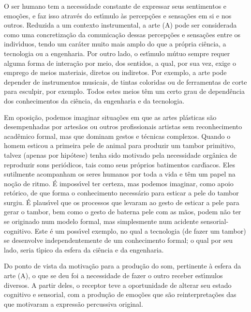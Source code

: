 \documentclass[
12pt,		%
openright,	%
twoside,  %
a4paper,			%
chapter=TITLE,		%
english,			%
french,				%
spanish,			%
brazil				%
]{USPSC-classe/USPSC}
\begin{document}
O ser humano tem a necessidade constante de expressar seus sentimentos e emo\c{c}\~oes, e faz isso atrav\'es do est\'{\i}mulo \`as percep\c{c}\~oes e sensa\c{c}\~oes em si e nos outros. Reduzida a um contexto instrumental, a arte (A) pode ser considerada como uma concretiza\c{c}\~ao da comunica\c{c}\~ao dessas percep\c{c}\~oes e sensa\c{c}\~oes entre os indiv\'{\i}duos, tendo um car\'ater muito mais amplo do que a pr\'opria ci\^encia, a tecnologia ou a engenharia. Por outro lado, o est\'{\i}mulo m\'utuo sempre requer alguma forma de intera\c{c}\~ao por meio, dos sentidos, a qual, por sua vez, exige o emprego de meios materiais, diretos ou indiretos. Por exemplo, a arte pode depender de instrumentos musicais, de tintas coloridas ou de ferramentas de corte para esculpir, por exemplo. Todos estes meios t\^em um certo grau de depend\^encia dos conhecimentos da ci\^encia, da engenharia e da tecnologia.









Em oposi\c{c}\~ao, podemos imaginar situa\c{c}\~oes em que as artes pl\'asticas s\~ao desempenhadas por artes\~aos ou outros profissionais artistas sem reconhecimento acad\^emico formal, mas que dominam gestos e t\'ecnicas complexos. Quando o homem esticou a primeira pele de animal para produzir um tambor primitivo, talvez (apenas por hip\'otese) tenha sido motivado pela necessidade org\^anica de reproduzir sons peri\'odicos, tais como seus pr\'oprios batimentos card\'{\i}acos. Eles sutilmente acompanham os seres humanos por toda a vida e t\^em um papel na no\c{c}\~ao de ritmo. \'E imposs\'{\i}vel ter certeza, mas podemos imaginar, como apoio ret\'orico, de que forma o conhecimento necess\'ario para esticar a pele do tambor surgiu. \'E plaus\'{\i}vel que os processos que levaram ao gesto de esticar a pele para gerar o tambor, bem como o gesto de \textquotedbl bater\textquotedbl  na pele com as m\~aos, podem n\~ao ter se originado num modelo formal, mas simplesmente num acidente sensorial-cognitivo. Este \'e um poss\'{\i}vel exemplo, no qual a tecnologia (de fazer um tambor) se desenvolve independentemente de um conhecimento formal; o qual por seu lado, seria t\'{\i}pico da esfera da ci\^encia e da engenharia.









Do ponto de vista da motiva\c{c}\~ao para a produ\c{c}\~ao do som, pertinente \`a esfera da arte (A), o que se deu foi a necessidade de fazer o outro receber est\'{\i}mulos diversos. A partir deles, o receptor teve a oportunidade de alterar seu estado cognitivo e sensorial, com a produ\c{c}\~ao de emo\c{c}\~oes que s\~ao reinterpreta\c{c}\~oes das que motivaram a express\~ao percussiva original.
\end{document}
